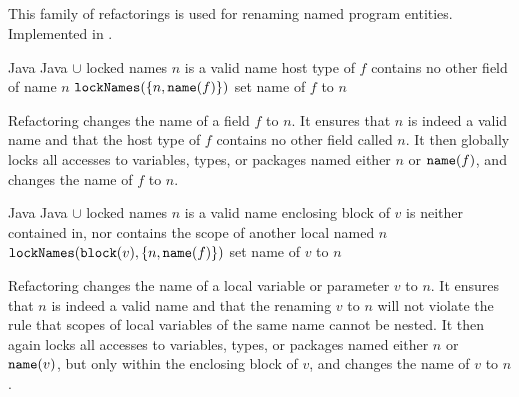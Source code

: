 \subsection{}
This family of refactorings is used for renaming named program entities. Implemented in .

\begin{algorithm}
\caption{$\refactoring{Rename Field}(f : \type{Field}, n : \type{Name})$}
\begin{algorithmic}[1]
\REQUIRE Java
\ENSURE Java $\cup$ locked names
\medskip
\STATE \assert $n$ is a valid name
\STATE \assert host type of $f$ contains no other field of name $n$
\STATE $\text{\texttt{lockNames}}(\{n, \text{\texttt{name}}(f)\})$
\STATE set name of $f$ to $n$
\end{algorithmic}
\end{algorithm}

Refactoring  changes the name of a field $f$ to $n$. It ensures that $n$ is indeed a valid name and that the host type of $f$ contains no other field called $n$. It then globally locks all accesses to variables, types, or packages named either $n$ or $\text{\texttt{name}}(f)$, and changes the name of $f$ to $n$.

\begin{algorithm}
\caption{$\refactoring{Rename Local}(v : \type{Local}, n : \type{Name})$}
\begin{algorithmic}[1]
\REQUIRE Java
\ENSURE Java $\cup$ locked names
\medskip
\STATE \assert $n$ is a valid name
\STATE \assert enclosing block of $v$ is neither contained in, nor contains the scope of another local named $n$
\STATE $\text{\texttt{lockNames}}(\text{\texttt{block}}(v), \{n, \text{\texttt{name}}(f)\})$
\STATE set name of $v$ to $n$
\end{algorithmic}
\end{algorithm}

Refactoring  changes the name of a local variable or parameter $v$ to $n$. It ensures that $n$ is indeed a valid name and that the renaming $v$ to $n$ will not violate the rule that scopes of local variables of the same name cannot be nested. It then again locks all accesses to variables, types, or packages named either $n$ or $\text{\texttt{name}}(v)$, but only within the enclosing block of $v$, and changes the name of $v$ to $n$.
